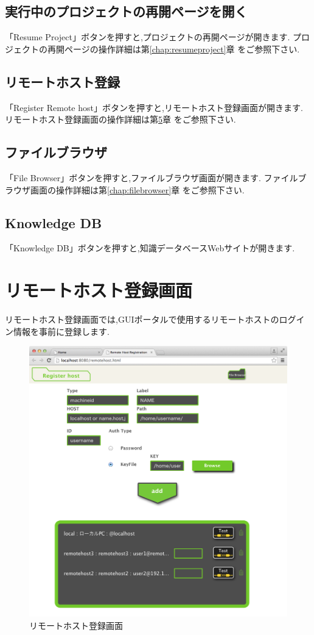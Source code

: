 \documentclass[a4paper,10pt,oneside]{jsbook}
\begin{document}
\section{実行中のプロジェクトの再開ページを開く}
「Resume Project」ボタンを押すと,プロジェクトの再開ページが開きます.
プロジェクトの再開ページの操作詳細は第\ref{chap:resumeproject}章 をご参照下さい.

\section{リモートホスト登録}
「Register Remote host」ボタンを押すと,リモートホスト登録画面が開きます.
リモートホスト登録画面の操作詳細は第\ref{chap:remotehost}章 をご参照下さい.

\section{ファイルブラウザ}
「File Browser」ボタンを押すと,ファイルブラウザ画面が開きます.
ファイルブラウザ画面の操作詳細は第\ref{chap:filebrowser}章 をご参照下さい.

\section{Knowledge DB}
「Knowledge DB」ボタンを押すと,知識データベースWebサイトが開きます.


\chapter{リモートホスト登録画面}
\label{chap:remotehost}
リモートホスト登録画面では,GUIポータルで使用するリモートホストのログイン情報を事前に登録します.

\begin{figure}[H]
	\begin{center}
		\includegraphics[width=12.0cm]{image/remotehost_000.png}
	\end{center}
	\caption{リモートホスト登録画面}
	\label{fig:remotehost}
\end{figure}
\end{document}
